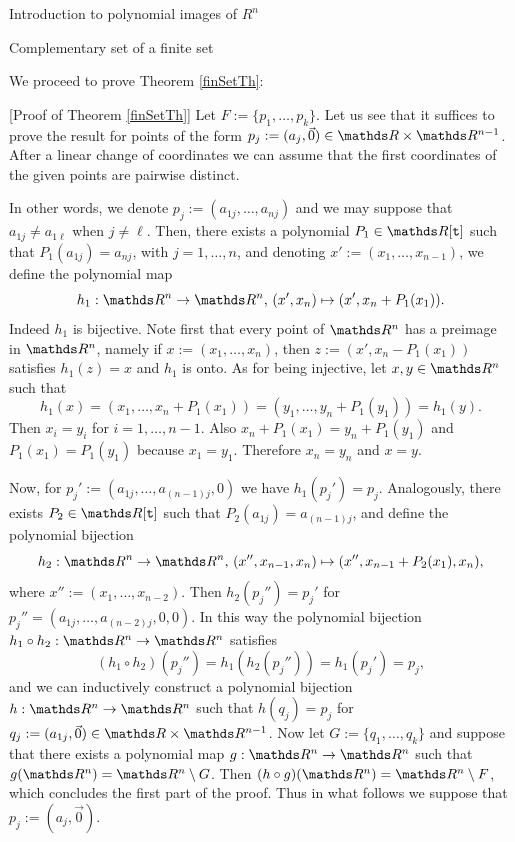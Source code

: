 \documentclass[11pt, a4paper, english, twoside, notitlepage, openright]{report}
\begin{document}
\begin{chapter}{Introduction to polynomial images of $R^n$}
\begin{section}{Complementary set of a finite set}
	
We proceed to prove Theorem \ref{finSetTh}:
	
\vspace{1mm}
	
[Proof of Theorem \ref{finSetTh}] Let $F:=\{p_1,\dots,p_k\}$. Let us see that it suffices to prove the result for points of the form $p_j:=(a_j,\vec{0})\in\R\times\R^{n-1}$. After a linear change of coordinates we can assume that the first coordinates of the given points are pairwise distinct. 

In other words, we denote $p_j:=(a_{1j},\dots,a_{nj})$ and we may suppose that $a_{1j}\neq a_{1\ell}$ when $j\neq\ell$. Then, there exists a polynomial $P_1\in\R[{\tt t}]$ such that $P_1(a_{1j})=a_{nj}$, with $j = 1,\dots, n$, and denoting $x':=(x_1,\dots,x_{n-1})$, we  define the polynomial map 
$$
h_1:\R^n\to\R^n,\, (x',x_n)\mapsto (x',x_n+P_1(x_1)).
$$
Indeed $h_1$ is bijective. Note first that every point of $\R^n$ has a preimage in $\R^n$, namely if $x:=(x_1, \dots,x_n)$, then $z:=(x',x_n-P_1(x_1))$ satisfies $h_1(z)=x$ and $h_1$ is onto. As for being injective, let $x,y\in\R^n$ such that 
$$
h_1(x)=(x_1,\dots,x_n+ P_1(x_1))=(y_1,\dots,y_n+ P_1(y_1))=h_1(y).
$$ 
Then $x_i=y_i$ for $i=1,\dots,n-1$. Also $x_n+P_1(x_1)=y_n+P_1(y_1)$ and $P_1(x_1)=P_1(y_1)$ because $x_1= y_1$. Therefore $x_n=y_n$ and $x=y$.
		
Now, for $p_j':=(a_{1j},\dots,a_{(n-1)j},0)$ we have $h_1(p_j')=p_j$. Analogously, there exists $P_2\in\R[{\tt t}]$ such that $P_2(a_{1j}) = a_{(n-1)j}$, and define the polynomial bijection
$$
h_2:\R^n\to\R^n,\,(x'',x_{n-1},x_n)\mapsto (x'',x_{n-1}+P_2(x_1),x_n),
$$
where $x'':=(x_1,\dots,x_{n-2})$. Then $h_2(p_j'')=p_j'$ for $p_j''= (a_{1j},\dots,a_{(n-2)j},0,0)$. In this way the polynomial bijection $h_1\circ h_2:\R^n\to\R^n$ satisfies
$$
(h_1\circ h_2)(p_j'')=h_1(h_2(p_j''))=h_1(p_j')=p_j,
$$
and we can inductively construct a polynomial bijection $h:\R^n\rightarrow\R^n$ such that $h(q_j)=p_j$ for $q_j:=(a_{1j},\vec{0})\in\R\times\R^{n-1}$. Now let $G:=\{q_1,\dots,q_k\}$ and suppose that there exists a polynomial map $g:\R^n\rightarrow\R^n$ such that $g(\R^n)=\R^n\setminus G$. Then $(h\circ g)(\R^n) = \R^n \setminus F$, which concludes the first part of the proof. Thus in what follows we suppose that $p_j:=(a_j,\vec{0})$.
		

\end{section}
\end{chapter}
\end{document}
